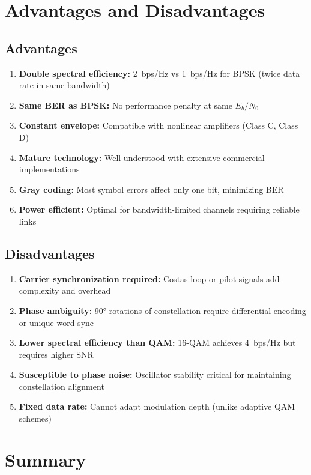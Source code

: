 \section{Advantages and Disadvantages}

\subsection*{Advantages}

\begin{enumerate}
\item \textbf{Double spectral efficiency:} 2~bps/Hz vs 1~bps/Hz for BPSK (twice data rate in same bandwidth)
\item \textbf{Same BER as BPSK:} No performance penalty at same $E_b/N_0$
\item \textbf{Constant envelope:} Compatible with nonlinear amplifiers (Class C, Class D)
\item \textbf{Mature technology:} Well-understood with extensive commercial implementations
\item \textbf{Gray coding:} Most symbol errors affect only one bit, minimizing BER
\item \textbf{Power efficient:} Optimal for bandwidth-limited channels requiring reliable links
\end{enumerate}

\subsection*{Disadvantages}

\begin{enumerate}
\item \textbf{Carrier synchronization required:} Costas loop or pilot signals add complexity and overhead
\item \textbf{Phase ambiguity:} 90° rotations of constellation require differential encoding or unique word sync
\item \textbf{Lower spectral efficiency than QAM:} 16-QAM achieves 4~bps/Hz but requires higher SNR
\item \textbf{Susceptible to phase noise:} Oscillator stability critical for maintaining constellation alignment
\item \textbf{Fixed data rate:} Cannot adapt modulation depth (unlike adaptive QAM schemes)
\end{enumerate}

\section{Summary}

